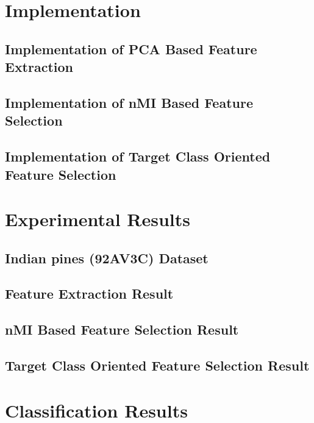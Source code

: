 \documentclass[document.tex]{subfiles}
\begin{document}
\section{Implementation}

\subsection{Implementation of PCA Based Feature Extraction}

\subsection{Implementation of nMI Based Feature Selection}

\subsection{Implementation of Target Class Oriented Feature Selection}

\section{Experimental Results}

\subsection{Indian pines (92AV3C) Dataset}
\subsection{Feature Extraction Result}
\subsection{nMI Based Feature Selection Result}
\subsection{Target Class Oriented Feature Selection Result}
\section{Classification Results}
\end{document}
